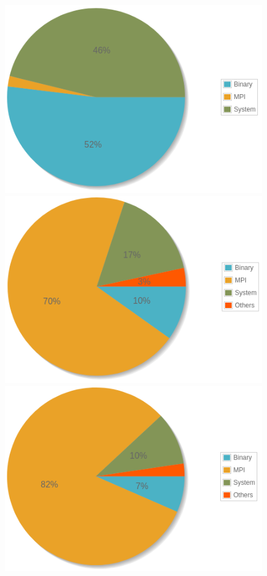 \documentclass[11pt,a4paper,oneside]{memoir}
\theoremstyle{definition}
\theoremstyle{remark}
\theoremstyle{plain}
\begin{document}
\begin{figure}
\begin{center}
\includegraphics[scale=0.45]{Images-Rapport/MAQAO_V1/miniXyce_RLC100_1proc.png}
\includegraphics[scale=0.45]{Images-Rapport/MAQAO_V1/miniXyce_RLC100_2proc.png}
\includegraphics[scale=0.45]{Images-Rapport/MAQAO_V1/miniXyce_RLC100_3proc.png}

\end{center}
\end{figure}
\end{document}
